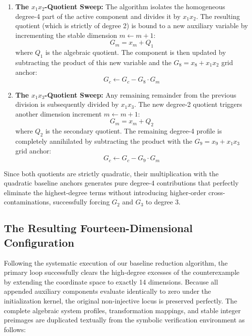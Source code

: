 \documentclass[11pt,a4paper]{article}
\begin{document}
\begin{enumerate}
    \item \textbf{The $x_1 x_2$-Quotient Sweep:} The algorithm isolates the homogeneous degree-4 part of the active component and divides it by $x_1 x_2$. The resulting quotient (which is strictly of degree 2) is bound to a new auxiliary variable by incrementing the stable dimension $m \leftarrow m + 1$:
    \begin{equation}
    G_m = x_m + Q_1
    \end{equation}
    where $Q_1$ is the algebraic quotient. The component is then updated by subtracting the product of this new variable and the $G_8 = x_8 + x_1 x_2$ grid anchor:
    \begin{equation}
    G_c \leftarrow G_c - G_8 \cdot G_m
    \end{equation}
    
    \item \textbf{The $x_1 x_3$-Quotient Sweep:} Any remaining remainder from the previous division is subsequently divided by $x_1 x_3$. The new degree-2 quotient triggers another dimension increment $m \leftarrow m + 1$:
    \begin{equation}
    G_m = x_m + Q_2
    \end{equation}
    where $Q_2$ is the secondary quotient. The remaining degree-4 profile is completely annihilated by subtracting the product with the $G_9 = x_9 + x_1 x_3$ grid anchor:
    \begin{equation}
    G_c \leftarrow G_c - G_9 \cdot G_m
    \end{equation}
\end{enumerate}
Since both quotients are strictly quadratic, their multiplication with the quadratic baseline anchors generates pure degree-4 contributions that perfectly eliminate the highest-degree terms without introducing higher-order cross-contaminations, successfully forcing $G_2$ and $G_3$ to degree 3.


\subsection{The Resulting Fourteen-Dimensional Configuration}
\label{subsec:cubic_14d_baseline}

Following the systematic execution of our baseline reduction algorithm, the primary loop successfully clears the high-degree excesses of the counterexample by extending the coordinate space to exactly 14 dimensions. Because all appended auxiliary components evaluate identically to zero under the initialization kernel, the original non-injective locus is preserved perfectly. The complete algebraic system profiles, transformation mappings, and stable integer preimages are duplicated textually from the symbolic verification environment as follows:
\end{document}
